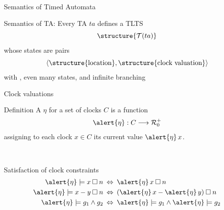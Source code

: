 \documentclass[aspectratio=169]{beamer}
\def\R{\mathcal{R}}
\def\TL#1{\mathcal{T}(#1)}
\newcommand{\fdec}[3]{#1: #2 \longrightarrow  #3}
\begin{document}
\begin{slide}{Semantics of Timed Automata}
\small

\begin{block}{Semantics of TA:}
Every TA $ta$ defines a TLTS 
\begin{equation*}
\structure{\TL{ta}}
\end{equation*}
whose states are pairs 
\begin{equation*}
\pair{\structure{\text{location}}, \structure{\text{clock valuation}} }
\end{equation*}
with , even  many states, and infinite branching
\end{block}
\end{slide}

\begin{slide}{Clock valuations}
\small


\begin{block}{Definition}
A  \alert{$\eta$} for a set of clocks $C$ is a function 
\begin{equation*}
\fdec{\alert{\eta}}{C}{\R_0^+}
\end{equation*}
assigning to each clock $x \in C$ its current value $\alert{\eta}\, x$.
\end{block}
~\\

\begin{block}{Satisfaction of clock constraints}
\begin{align*}
\alert{\eta} \models x \mathbin{\square} n \; & \dimp\; \alert{\eta}\, x \mathbin{\square} n\\
\alert{\eta} \models x-y \mathbin{\square} n \; & \dimp\; (\alert{\eta}\, x - \alert{\eta}\, y) \mathbin{\square} n\\
\alert{\eta} \models g_1 \land g_2 \; & \dimp\; \alert{\eta} \models g_1 \land \alert{\eta} \models g_2
\end{align*}
\end{block}
\end{slide}
\end{document}
